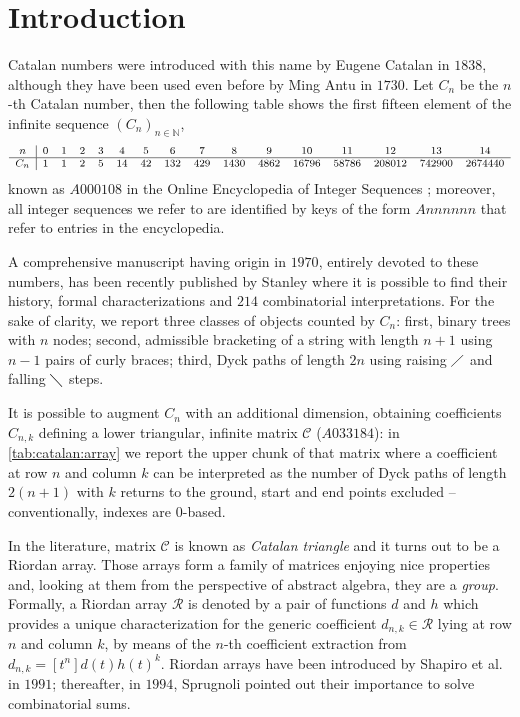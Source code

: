 
\section{Introduction}

\noindent Catalan numbers were introduced with this name by
Eugene Catalan in $1838$, although they have been used even before by Ming Antu
in $1730$. Let $C_{n}$ be the $n$-th Catalan number, then the following
table shows the first fifteen element of the infinite sequence
$\left(C_{n}\right)_{n\in\mathbb{N}}$,
\begin{displaymath}
    \footnotesize
    \begin{array}{c|ccccccccccccccc}
        n & 0 & 1 & 2 & 3 & 4 & 5 & 6 & 7 & 8 & 9 & 10 & 11 & 12 & 13 & 14 \\
        \hline
        C_{n} & 1 & 1 & 2 & 5 & 14 & 42 & 132 & 429 & 1430 & 4862 & 16796 & 58786 & 208012 & 742900 & 2674440
    \end{array}
\end{displaymath} 
known as $A000108$ in the Online Encyclopedia of Integer Sequences
\cite{sloane:oeis}; moreover, all integer sequences we refer to are identified
by keys of the form $Annnnnn$ that refer to entries in the encyclopedia.


A comprehensive manuscript having origin in $1970$, entirely devoted to these
numbers, has been recently published by Stanley \cite{stanley:2015} where it is
possible to find their history, formal characterizations and $214$
combinatorial interpretations.  For the sake of clarity, we report three
classes of objects counted by $C_{n}$: first, binary trees with $n$ nodes;
second, admissible bracketing of a string with length $n+1$ using $n-1$ pairs
of curly braces; third, Dyck paths of length $2n$ using raising $\diagup$ and
falling $\diagdown$ steps.

It is possible to augment $C_{n}$ with an additional dimension, obtaining
coefficients $C_{n,k}$ defining a lower triangular, infinite matrix
$\mathcal{C}$ ($A033184$): in \autoref{tab:catalan:array} we report the upper
chunk of that matrix where a coefficient at row $n$ and column $k$ can be
interpreted as the number of Dyck paths of length $2(n+1)$ with $k$ returns to
the ground, start and end points excluded -- conventionally, indexes are
$0$-based.



In the literature, matrix $\mathcal{C}$ is known as \emph{Catalan triangle} and
it turns out to be a Riordan array. Those arrays form a family of matrices
enjoying nice properties and, looking at them from the perspective of abstract
algebra, they are a \textit{group}. Formally, a Riordan array $\mathcal{R}$ is
denoted by a pair of functions $d$ and $h$ which provides a unique
characterization for the generic coefficient $d_{n,k}\in\mathcal{R}$ lying at
row $n$ and column $k$, by means of the $n$-th coefficient extraction from
$\displaystyle d_{n,k} = [t^{n}]d(t)h(t)^{k}$.
Riordan arrays have been introduced by Shapiro et al. \cite{shapiro:1991} in $1991$;
thereafter, in $1994$, Sprugnoli \cite{sprugnoli:1991} pointed out their importance
to solve combinatorial sums.

